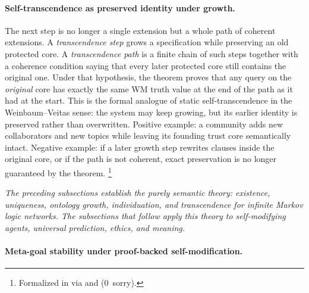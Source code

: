 \documentclass[11pt,openany]{report}
\begin{document}
\paragraph{Self-transcendence as preserved identity under growth.}
The next step is no longer a single extension but a whole path of coherent
extensions.  A \emph{transcendence step} grows a specification while preserving
an old protected core.  A \emph{transcendence path} is a finite chain of such
steps together with a coherence condition saying that every later protected
core still contains the original one.  Under that hypothesis, the theorem
 proves that any query on the
\emph{original} core has exactly the same WM truth value at the end of the
path as it had at the start.  This is the formal analogue of static
self-transcendence in the Weinbaum--Veitas sense: the system may keep growing,
but its earlier identity is preserved rather than overwritten.  Positive
example: a community adds new collaborators and new topics while leaving its
founding trust core semantically intact.  Negative example: if a later growth
step rewrites clauses inside the original core, or if the path is not coherent,
exact preservation is no longer guaranteed by the theorem.%
\footnote{Formalized in
via  and
 (0~sorry).}

\bigskip
\noindent\textit{The preceding subsections establish the purely semantic
  theory: existence, uniqueness, ontology growth, individuation, and
  transcendence for infinite Markov logic networks.  The subsections that
  follow apply this theory to self-modifying agents, universal prediction,
  ethics, and meaning.}
\bigskip

\paragraph{Meta-goal stability under proof-backed self-modification.}
\end{document}
